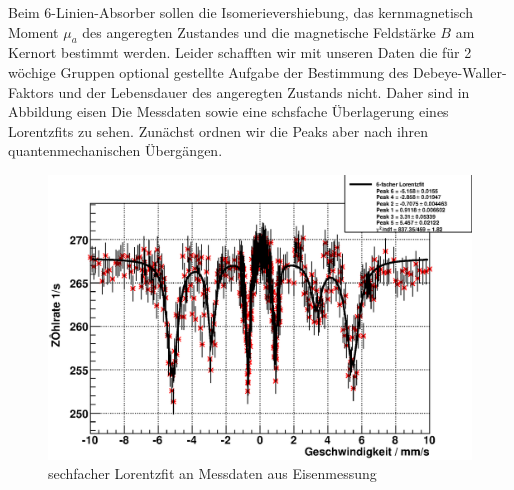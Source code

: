 \documentclass[12pt]{article}
\begin{document}
Beim 6-Linien-Absorber sollen die Isomerievershiebung, das kernmagnetisch Moment $\mu_a$ des angeregten Zustandes und die magnetische Feldstärke $B$
am Kernort bestimmt werden. Leider schafften wir mit unseren Daten die für 2 wöchige Gruppen optional gestellte Aufgabe der Bestimmung des
Debeye-Waller-Faktors und der Lebensdauer des angeregten Zustands nicht. Daher sind in Abbildung \refname{eisen} Die Messdaten sowie eine schsfache
Überlagerung eines Lorentzfits zu sehen. Zunächst ordnen wir die Peaks aber nach ihren quantenmechanischen Übergängen. 
\begin{figure}[H]
 \includegraphics[width=0.9\linewidth]{pictures/eisen.eps}
 \caption{sechfacher Lorentzfit an Messdaten aus Eisenmessung}
\end{figure}
\end{document}
